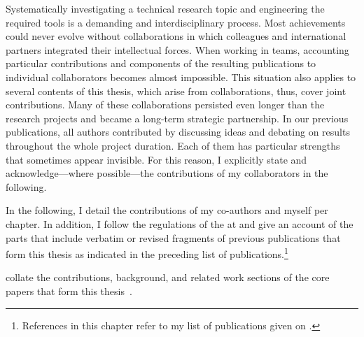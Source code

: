 
\label{ch:Collaborations}

Systematically investigating a technical research topic and engineering the required tools is a demanding and interdisciplinary process. Most achievements could never evolve without collaborations in which colleagues and international partners integrated their intellectual forces. When working in teams, accounting particular contributions and components of the resulting publications to individual collaborators becomes almost impossible. This situation also applies to several contents of this thesis, which arise from collaborations, thus, cover joint contributions. Many of these collaborations persisted even longer than the research projects and became a long-term strategic partnership.
In our previous publications, all authors contributed by discussing ideas and debating on results throughout the whole project duration. Each of them has particular strengths that sometimes appear invisible. For this reason, I explicitly state and acknowledge---where possible---the contributions of my collaborators in the following.

In the following, I detail the contributions of my co-authors and myself per chapter. In addition, I follow the regulations of the \myFaculty{} at \myUni{} and give an account of the parts that include verbatim or revised fragments of previous publications that form this thesis as indicated in the preceding list of publications.\footnote{References in this chapter refer to my list of publications given on .}

\sloppy

 collate the contributions, background, and related work sections of the core papers that form this thesis~\cite{Stute2018a,Stute2020}.


\fussy

\label{ch:CollaborationsEnd}